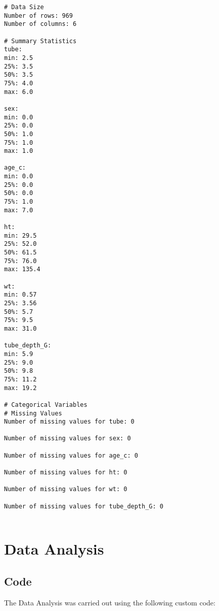 \documentclass[11pt]{article}
\begin{document}
\begin{Verbatim}[tabsize=4]
# Data Size
Number of rows: 969
Number of columns: 6

# Summary Statistics
tube:
min: 2.5
25%: 3.5
50%: 3.5
75%: 4.0
max: 6.0

sex:
min: 0.0
25%: 0.0
50%: 1.0
75%: 1.0
max: 1.0

age_c:
min: 0.0
25%: 0.0
50%: 0.0
75%: 1.0
max: 7.0

ht:
min: 29.5
25%: 52.0
50%: 61.5
75%: 76.0
max: 135.4

wt:
min: 0.57
25%: 3.56
50%: 5.7
75%: 9.5
max: 31.0

tube_depth_G:
min: 5.9
25%: 9.0
50%: 9.8
75%: 11.2
max: 19.2

# Categorical Variables
# Missing Values
Number of missing values for tube: 0

Number of missing values for sex: 0

Number of missing values for age_c: 0

Number of missing values for ht: 0

Number of missing values for wt: 0

Number of missing values for tube_depth_G: 0


\end{Verbatim}

\section{Data Analysis}
\subsection{{Code}}
The Data Analysis was carried out using the following custom code:
\end{document}
